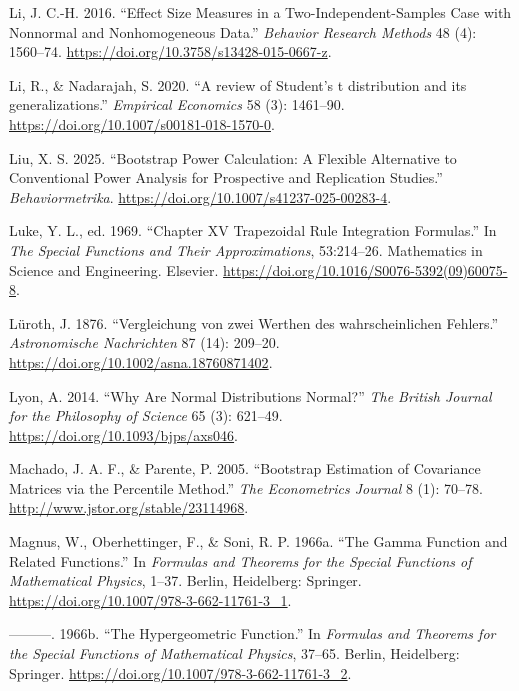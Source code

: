 \documentclass[
]{article}
\newlength{\cslhangindent}
\newlength{\cslentryspacingunit} %
\newenvironment{CSLReferences}[2] %
 {%
  \setlength{\parindent}{0pt}
  \ifodd #1
  \let\oldpar\par
  \def\par{\hangindent=\cslhangindent\oldpar}
  \fi
  \setlength{\parskip}{#2\cslentryspacingunit}
 }%
 {}
\begin{document}
\begin{CSLReferences}{1}{0}
\leavevmode{}%
Li, J. C.-H. 2016. {``Effect Size Measures in a Two-Independent-Samples
Case with Nonnormal and Nonhomogeneous Data.''} \emph{Behavior Research
Methods} 48 (4): 1560--74.
\url{https://doi.org/10.3758/s13428-015-0667-z}.

\leavevmode{}%
Li, R., \& Nadarajah, S. 2020. {``{A review of Student's t distribution
and its generalizations}.''} \emph{Empirical Economics} 58 (3):
1461--90. \url{https://doi.org/10.1007/s00181-018-1570-0}.

\leavevmode{}%
Liu, X. S. 2025. {``Bootstrap Power Calculation: A Flexible Alternative
to Conventional Power Analysis for Prospective and Replication
Studies.''} \emph{Behaviormetrika}.
\url{https://doi.org/10.1007/s41237-025-00283-4}.

\leavevmode{}%
Luke, Y. L., ed. 1969. {``Chapter XV Trapezoidal Rule Integration
Formulas.''} In \emph{The Special Functions and Their Approximations},
53:214--26. Mathematics in Science and Engineering. Elsevier.
\url{https://doi.org/10.1016/S0076-5392(09)60075-8}.

\leavevmode{}%
Lüroth, J. 1876. {``{Vergleichung von zwei Werthen des wahrscheinlichen
Fehlers}.''} \emph{Astronomische Nachrichten} 87 (14): 209--20.
\url{https://doi.org/10.1002/asna.18760871402}.

\leavevmode{}%
Lyon, A. 2014. {``Why Are Normal Distributions Normal?''} \emph{The
British Journal for the Philosophy of Science} 65 (3): 621--49.
\url{https://doi.org/10.1093/bjps/axs046}.

\leavevmode{}%
Machado, J. A. F., \& Parente, P. 2005. {``Bootstrap Estimation of
Covariance Matrices via the Percentile Method.''} \emph{The Econometrics
Journal} 8 (1): 70--78. \url{http://www.jstor.org/stable/23114968}.

\leavevmode{}%
Magnus, W., Oberhettinger, F., \& Soni, R. P. 1966a. {``The Gamma
Function and Related Functions.''} In \emph{Formulas and Theorems for
the Special Functions of Mathematical Physics}, 1--37. Berlin,
Heidelberg: Springer. \url{https://doi.org/10.1007/978-3-662-11761-3_1}.

\leavevmode{}%
---------. 1966b. {``The Hypergeometric Function.''} In \emph{Formulas
and Theorems for the Special Functions of Mathematical Physics}, 37--65.
Berlin, Heidelberg: Springer.
\url{https://doi.org/10.1007/978-3-662-11761-3_2}.


\end{CSLReferences}
\end{document}

